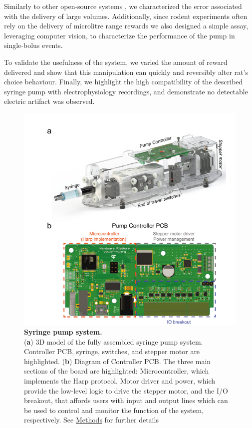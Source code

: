 Similarly to other open-source systems \citep{Wijnen2014, Amarante2019}, we characterized the error associated with the delivery of large volumes. Additionally, since rodent experiments often rely on the delivery of microlitre range rewards we also designed a simple assay, leveraging computer vision, to characterize the performance of the pump in single-bolus events.

To validate the usefulness of the system, we varied the amount of reward delivered and show that this manipulation can quickly and reversibly alter rat's choice behaviour. Finally, we highlight the high compatibility of the described syringe pump with electrophysiology recordings, and demonstrate no detectable electric artifact was observed.


\begin{figure}
	\centering
	\includegraphics[width=1.0\linewidth]{Figures/Artboard 1.pdf}
	\caption{\textbf{Syringe pump system.}\\
		(\textbf{a}) 3D model of the fully assembled syringe pump system. Controller PCB, syringe, switches, and stepper motor are highlighted.  (\textbf{b}) Diagram of Controller PCB. The three main sections of the board are highlighted: Microcontroller, which implements the Harp protocol. Motor driver and power, which provide the low-level logic to drive the stepper motor, and the I/O breakout, that affords users with input and output lines which can be used to control and monitor the function of the system, respectively. See \hyperref[s:methods]{Methods} for further details}
	\label{fig:PumpDrawing}
\end{figure}

